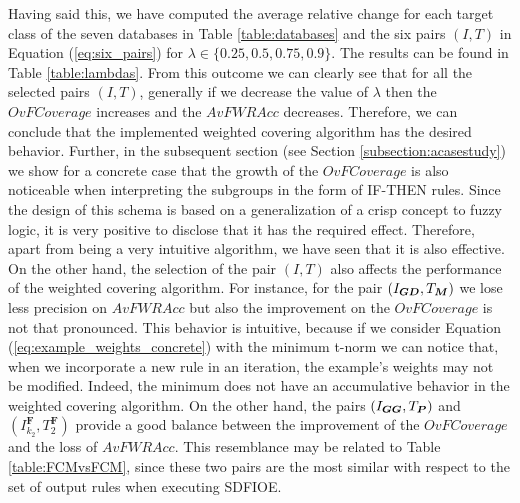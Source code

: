 Having said this, we have computed the average relative change for each target class of the seven databases in Table \ref{table:databases} and the six pairs $(I,T)$ in Equation (\ref{eq:six_pairs}) for $\lambda \in \{0.25,0.5,0.75,0.9\}$. The results can be found in Table \ref{table:lambdas}. From this outcome we can clearly see that for all the selected pairs $(I,T)$, generally if we decrease the value of $\lambda$ then the $OvFCoverage$ increases and the $AvFWRAcc$ decreases. Therefore, we can conclude that the implemented weighted covering algorithm has the desired behavior. Further, in the subsequent section (see Section \ref{subsection:acasestudy}) we show for a concrete case that the growth of the $OvFCoverage$ is also noticeable when interpreting the subgroups in the form of IF-THEN rules. Since the design of this schema is based on a generalization of a crisp concept to fuzzy logic, it is very positive to disclose that it has the required effect. Therefore, apart from being a very intuitive algorithm, we have seen that it is also effective. On the other hand, the selection of the pair $(I,T)$ also affects the performance of the weighted covering algorithm. For instance, for the pair $(I_{\bm{GD}},T_{\bm{M}})$ we lose less precision on $AvFWRAcc$ but also the improvement on the $OvFCoverage$ is not that pronounced. This behavior is intuitive, because if we consider Equation (\ref{eq:example_weights_concrete}) with the minimum t-norm we can notice that, when we incorporate a new rule in an iteration, the example's weights may not be modified. Indeed, the minimum does not have an accumulative behavior in the weighted covering algorithm. On the other hand, the pairs $(I_{\bm{GG}},T_{\bm{P}})$ and $(I^{\bm{F}}_{k_2},T_2^{\bm{F}})$ provide a good balance between the improvement of the $OvFCoverage$ and the loss of $AvFWRAcc$. This resemblance may be related to Table \ref{table:FCMvsFCM}, since these two pairs are the most similar with respect to the set of output rules when executing SDFIOE.



